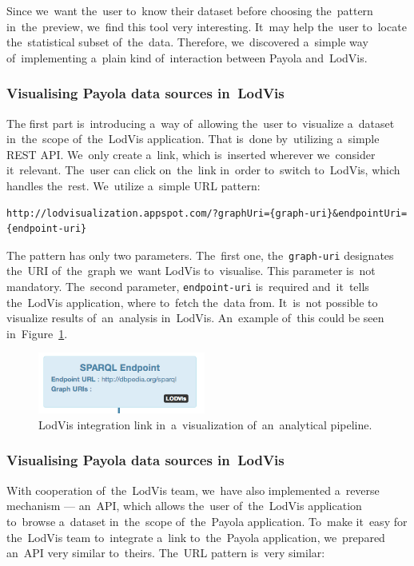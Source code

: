 Since we~want the~user to~know their dataset before choosing the~pattern in~the~preview, we~find this tool very interesting. It~may help the~user to~locate the~statistical subset of~the~data. Therefore, we~discovered a~simple way of~implementing a~plain kind of~interaction between Payola and~LodVis.

\subsubsection{Visualising Payola data sources in~LodVis}
The first part is~introducing a~way of~allowing the~user to~visualize a~dataset in~the~scope of~the~LodVis application. That is~done by~utilizing a~simple REST API. We~only create a~link, which is~inserted wherever we~consider it~relevant. The~user can click on~the~link in~order to~switch to~LodVis,
which handles the~rest. We~utilize a~simple URL pattern:

{  \scriptsize
\begin{verbatim}
http://lodvisualization.appspot.com/?graphUri={graph-uri}&endpointUri={endpoint-uri}
\end{verbatim}
}

The pattern has only two parameters. The~first one, the~\texttt{graph-uri} 
designates the~URI of~the~graph we~want LodVis to~visualise. This parameter is~not mandatory. The~second parameter, \texttt{endpoint-uri} is~required and~it~tells the~LodVis application, where to~fetch the~data from. It~is~not possible 
to visualize results of~an~analysis in~LodVis. An~example of~this could
be seen in~Figure~\ref{fig:lodvis-int}.

\begin{figure}
	\centering
	\includegraphics[width=55mm]{img/lodvis-int.png}
	\caption{LodVis integration link in~a~visualization of~an~analytical pipeline.}
	\label{fig:lodvis-int}
\end{figure}


\subsubsection{Visualising Payola data sources in~LodVis}
With cooperation of~the~LodVis team, we~have also implemented a~reverse 
mechanism --- an~API, which allows the~user of~the~LodVis application to~browse a~dataset in~the~scope of~the~Payola application. To~make it~easy for the~LodVis 
team to~integrate a~link to~the~Payola application, we~prepared an~API very 
similar to~theirs. The~URL pattern is~very similar:

